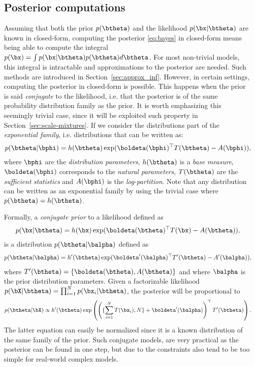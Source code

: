 \subsection{Posterior computations}
\label{sec:posterior}
Assuming that both the prior $p(\btheta)$ and the likelihood $p(\bx|\btheta)$ are known in closed-form, computing the posterior \eqref{eq:bayes} in closed-form means being able to compute the integral $p(\bx)=\int p(\bx|\btheta)p(\btheta)d\btheta$.
For most non-trivial models, this integral is intractable and approximations to the posterior are needed.
Such methods are introduced in Section~\ref{sec:approx_inf}.
However, in certain settings, computing the posterior in closed-form is possible.
This happens when the prior is said \textit{conjugate} to the likelihood, i.e. that the posterior is of the same probability distribution family as the prior.
It is worth emphasizing this seemingly trivial case, since it will be exploited such property in Section~\ref{sec:scale-mixtures}.
If we consider the distributions part of the \textit{exponential family}, i.e. distributions that can be written as:
\begin{align}
    p(\btheta|\bphi) = h(\btheta)\exp(\boldeta(\bphi)^\top T(\btheta) - A(\bphi)),
    \label{eq:expfamily}
\end{align}
where $\bphi$ are the \textit{distribution parameters}, $h(\btheta)$ is a \textit{base measure}, $\boldeta(\bphi)$ corresponds to the \textit{natural parameters}, $T(\btheta)$ are the \textit{sufficient statistics} and $A(\bphi)$ is the \textit{log-partition}.
Note that any distribution can be written as an exponential family by using the trivial case where $p(\btheta)=h(\btheta)$.

Formally, a \textit{conjugate prior} to a likelihood defined as
\begin{align}
    p(\bx|\btheta) = h(\bx)\exp(\boldeta(\btheta)^\top T(\bx) - A(\btheta)),
    \label{eq:explikelihood}
\end{align}
is a distribution $p(\btheta|\balpha)$ defined as
\begin{align}
    p(\btheta|\balpha) = h'(\btheta)\exp(\boldeta'(\balpha)^\top T'(\btheta) - A'(\balpha)),
    \label{eq:expprior}
\end{align}
where $T'(\btheta) = \left\{\boldeta(\btheta), A(\btheta)\right\}$ and where $\balpha$ is the prior distribution parameters.
Given a factorizable likelihood $p(\bX|\btheta) = \prod_{i=1}^N p(\bx_i|\btheta)$, the posterior will be proportional to
\begin{align*}
    p(\btheta|\bX) \propto h'(\btheta)\exp\left(\left(\{\sum_{i=1}^N T(\bx_i), N\} + \boldeta'(\balpha)\right)^\top T'(\btheta)\right).
\end{align*}
The latter equation can easily be normalized since it is a known distribution of the same family of the prior.
Such conjugate models, are very practical as the posterior can be found in one step, but due to the constraints also tend to be too simple for real-world complex models.

